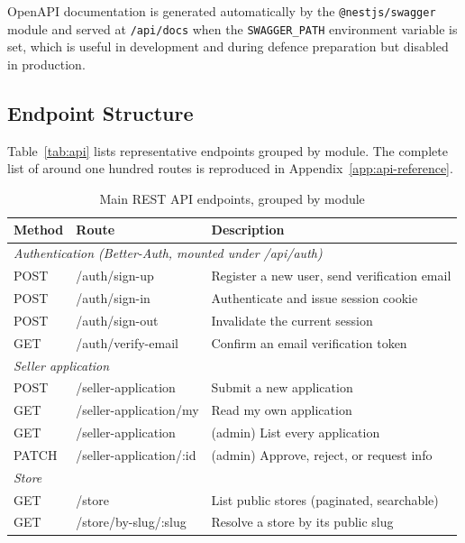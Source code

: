 \documentclass[12pt, a4paper, oneside]{report}
\begin{document}
OpenAPI documentation is generated automatically by the
\texttt{@nestjs/swagger} module and served at
\texttt{/api/docs} when the \texttt{SWAGGER\_PATH} environment
variable is set, which is useful in development and during
defence preparation but disabled in production.

\subsection{Endpoint Structure}

Table~\ref{tab:api} lists representative endpoints grouped by
module. The complete list of around one hundred routes is
reproduced in Appendix~\ref{app:api-reference}.

\begin{table}[H]
  \centering
  \caption{Main REST API endpoints, grouped by module}
  \begin{tabularx}{\textwidth}{llX}
    \toprule
    \textbf{Method} & \textbf{Route} & \textbf{Description} \\
    \midrule
    \multicolumn{3}{l}{\textit{Authentication (Better-Auth, mounted under /api/auth)}} \\
    POST  & /auth/sign-up                & Register a new user, send verification email \\
    POST  & /auth/sign-in                & Authenticate and issue session cookie \\
    POST  & /auth/sign-out               & Invalidate the current session \\
    GET   & /auth/verify-email           & Confirm an email verification token \\
    \midrule
    \multicolumn{3}{l}{\textit{Seller application}} \\
    POST  & /seller-application          & Submit a new application \\
    GET   & /seller-application/my       & Read my own application \\
    GET   & /seller-application          & (admin) List every application \\
    PATCH & /seller-application/:id      & (admin) Approve, reject, or request info \\
    \midrule
    \multicolumn{3}{l}{\textit{Store}} \\
    GET   & /store                       & List public stores (paginated, searchable) \\
    GET   & /store/by-slug/:slug         & Resolve a store by its public slug \\

\end{tabularx}
\end{table}
\end{document}
